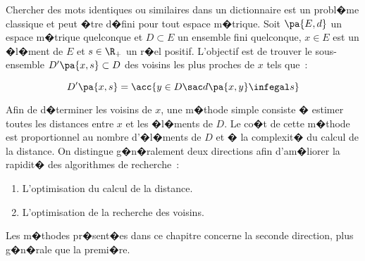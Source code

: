 %
\firstpassagedo{}
%
\firstpassagedo{}



\newcommand{\initialisation}[0]{initialisation : \\}
\newcommand{\step}[0]{body : \newline}
\newcommand{\terminaison}[0]{termination : \\}
\newcommand{\for}[2]{for $#1$ to $#2$ do}
\newcommand{\forend}[0]{end for \\}
\newcommand{\while}[1]{while $\pa { #1 }$ do\\}
\newcommand{\whilenotl}[1]{while $\pa { #1 }$ do}
\newcommand{\whileend}[0]{end while}

\newenvironment{algopar}{}{}
\newcommand{\ind}[0]{\null \quad}

\label{space_metric_introduction}


\sloppy


Chercher des mots identiques ou similaires dans un dictionnaire est un probl�me classique et peut �tre d�fini pour tout espace m�trique.  Soit $\pa{E,d}$ un espace m�trique quelconque et $D \subset E$ un ensemble fini quelconque, $x \in E$ est un �l�ment de $E$ et $s \in \R_+$ un r�el positif. L'objectif est de trouver le sous-ensemble $D'\pa{x,s} \subset D$ des voisins les plus proches de $x$ tels que~:

    $$
    D'\pa{x,s} = \acc{  y \in D \sac d\pa{x,y} \infegal s}
    $$

Afin de d�terminer les voisins de $x$, une m�thode simple consiste � estimer toutes les distances entre $x$ et les �l�ments de $D$. Le co�t de cette m�thode est proportionnel au nombre d'�l�ments de $D$ et � la complexit� du calcul de la distance. On distingue g�n�ralement deux directions afin d'am�liorer la rapidit� des algorithmes de recherche~:

    \begin{enumerate}
    \item L'optimisation du calcul de la distance.
    \item L'optimisation de la recherche des voisins.
    \end{enumerate}


Les m�thodes pr�sent�es dans ce chapitre concerne la seconde direction, plus g�n�rale que la premi�re.








